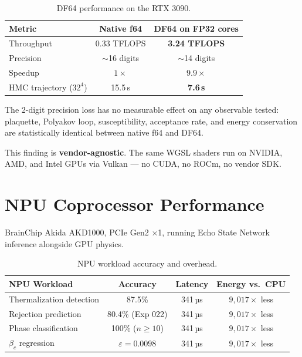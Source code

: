\documentclass[11pt,a4paper]{article}
\newcommand{\btc}{\beta_c}
\begin{document}
\begin{table}[H]
\centering
\caption{DF64 performance on the RTX 3090.}
\label{tab:df64}
\renewcommand{\arraystretch}{1.25}
\begin{tabular}{lcc}
\toprule
Metric & Native f64 & DF64 on FP32 cores \\
\midrule
Throughput          & 0.33 TFLOPS  & \textbf{3.24 TFLOPS} \\
Precision           & $\sim$16 digits & $\sim$14 digits \\
Speedup             & $1\times$    & \textbf{$9.9\times$} \\
HMC trajectory ($32^4$) & 15.5\,s  & \textbf{7.6\,s} \\
\bottomrule
\end{tabular}
\end{table}

The 2-digit precision loss has no measurable effect on any observable tested:
plaquette, Polyakov loop, susceptibility, acceptance rate, and energy
conservation are statistically identical between native f64 and DF64.

This finding is \textbf{vendor-agnostic}.  The same WGSL shaders run on
NVIDIA, AMD, and Intel GPUs via Vulkan --- no CUDA, no ROCm, no vendor SDK.

\FloatBarrier
\section{NPU Coprocessor Performance}

BrainChip Akida AKD1000, PCIe Gen2 $\times$1, running Echo State Network
inference alongside GPU physics.

\begin{table}[H]
\centering
\caption{NPU workload accuracy and overhead.}
\label{tab:npu_acc}
\renewcommand{\arraystretch}{1.25}
\begin{tabular}{lccc}
\toprule
NPU Workload & Accuracy & Latency & Energy vs.\ CPU \\
\midrule
Thermalization detection & 87.5\%                & 341\,µs & $9{,}017\times$ less \\
Rejection prediction     & 80.4\% (Exp 022)      & 341\,µs & $9{,}017\times$ less \\
Phase classification     & 100\% ($n \ge 10$)    & 341\,µs & $9{,}017\times$ less \\
$\btc$ regression        & $\varepsilon = 0.0098$ & 341\,µs & $9{,}017\times$ less \\
\bottomrule
\end{tabular}
\end{table}
\end{document}

